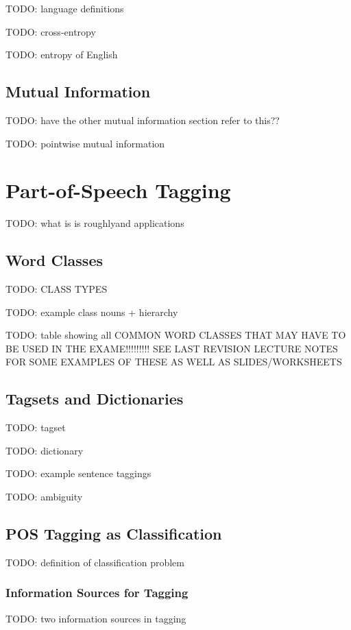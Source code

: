 \documentclass{article}
\begin{document}
TODO: language definitions

TODO: cross-entropy

TODO: entropy of English

\subsection{Mutual Information}

TODO: have the other mutual information section refer to this??

TODO: pointwise mutual information

\section{Part-of-Speech Tagging}

TODO: what is is roughlyand applications

\subsection{Word Classes}

TODO: CLASS TYPES

TODO: example class nouns + hierarchy

TODO: table showing all COMMON WORD CLASSES THAT MAY HAVE TO BE USED IN THE EXAME!!!!!!!!! SEE LAST REVISION LECTURE NOTES FOR SOME EXAMPLES OF THESE AS WELL AS SLIDES/WORKSHEETS

\subsection{Tagsets and Dictionaries}

TODO: tagset

TODO: dictionary

TODO: example sentence taggings

TODO: ambiguity

\subsection{POS Tagging as Classification}

TODO: definition of classification problem

\subsubsection{Information Sources for Tagging}

TODO: two information sources in tagging
\end{document}
